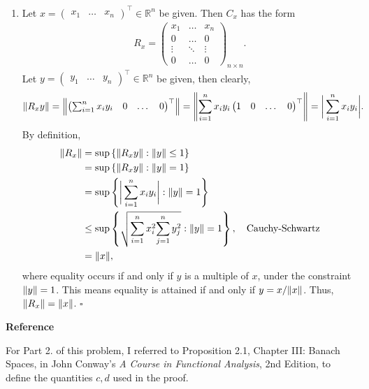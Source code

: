 \documentclass[11pt]{article}
\begin{document}
\begin{enumerate}
	
	\item  Let ${x} = \begin{pmatrix}
	x_1 & \dots & x_n
	\end{pmatrix}^\top \in \mathbb{R}^n$ be given. Then $C_x$ has the form
	\begin{align*}
	R_x = \begin{pmatrix}
	x_1 & \dots & x_n\\
	0 & \dots & 0\\
	\vdots & \ddots  & \vdots\\
	 0 & \dots & 0
	\end{pmatrix}_{n\times n}.
	\end{align*} 
	Let ${y} = \begin{pmatrix}
	y_1 & \dots & y_n
	\end{pmatrix}^\top \in \mathbb{R}^n$ be given, then clearly,
	\begin{align*}
	\norm{ R_xy} &= \norm{ \begin{pmatrix}
	\sum^n_{i=1}x_iy_i & 0 & \dots & 0
	\end{pmatrix}^\top } =  \norm{ \sum^n_{i=1}x_iy_i \begin{pmatrix}
	1 & 0 & \dots & 0
	\end{pmatrix}^\top }= \bigg\vert \sum^n_{i=1}x_i y_i \bigg\vert.
	\end{align*}
	By definition, 
	\begin{align*}
	\norm{R_x} &= \sup \left\{\norm{R_x y} : \norm{y} \leq 1\right\}\nonumber\\
	&= \sup \left\{\norm{R_x y} : \norm{y}  = 1\right\}\nonumber\\
	&= \sup \left\{ \bigg\vert \sum^n_{i=1}x_i y_i \bigg\vert : \norm{y}  = 1\right\}\nonumber\\
	&\leq \sup \left\{ \sqrt{\sum^n_{i=1}x_i^2 {\sum^n_{j=1}y_j^2}} : \norm{y}  = 1\right\},\quad \text{Cauchy-Schwartz}\nonumber\\
	&= \norm{x} ,
	\end{align*}
	where equality occurs if and only if $y$ is a multiple of $x$, under the constraint $\norm{y}  = 1$. This means equality is attained if and only if $y = x/\norm{x} $. Thus, $\norm{R_x}  = \norm{x} $. \hfill $\square$
\end{enumerate}




\noindent \textbf{Reference}



For Part 2. of this problem, I referred to Proposition 2.1, Chapter III: Banach Spaces, in John Conway's \textit{A Course in Functional Analysis}, 2nd Edition, to define the quantities $c,d$ used in the proof. 
\end{document}
